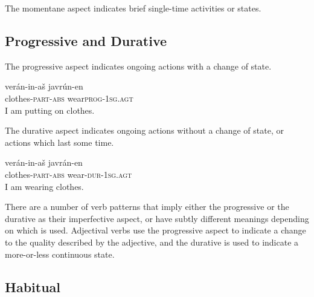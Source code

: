 \documentclass[grammar]{subfiles}
\begin{document}
The momentane aspect indicates brief single-time activities or states. 


\subsection{Progressive and Durative}
\label{vp:ssec_progressive_durative}

The progressive aspect indicates ongoing actions with a change of state.  

\begin{exe}
  \ex\label{ex:vm_putting_on_clothes} 
  \gll verán-in-aš javrún-en\\
  clothes\textsc{-part-abs} wear\textsc{\bs prog-1sg.agt}\\
  \glt I am putting on clothes.
\end{exe}

The durative aspect indicates ongoing actions without a change of state, or
actions which last some time.

\begin{exe}
  \ex\label{ex:vm_wearing_clothes} 
  \gll verán-in-aš javrán-en\\
  clothes\textsc{-part-abs} wear\textsc{-dur-1sg.agt}\\
  \glt I am wearing clothes.
\end{exe}

There are a number of verb patterns that imply either the progressive or the
durative as their imperfective aspect, or have subtly different meanings
depending on which is used.  Adjectival verbs use the progressive aspect to
indicate a change to the quality described by the adjective, and the durative
is used to indicate a more-or-less continuous state. 






\subsection{Habitual}
\label{vp:ssec_habitual}
\end{document}
